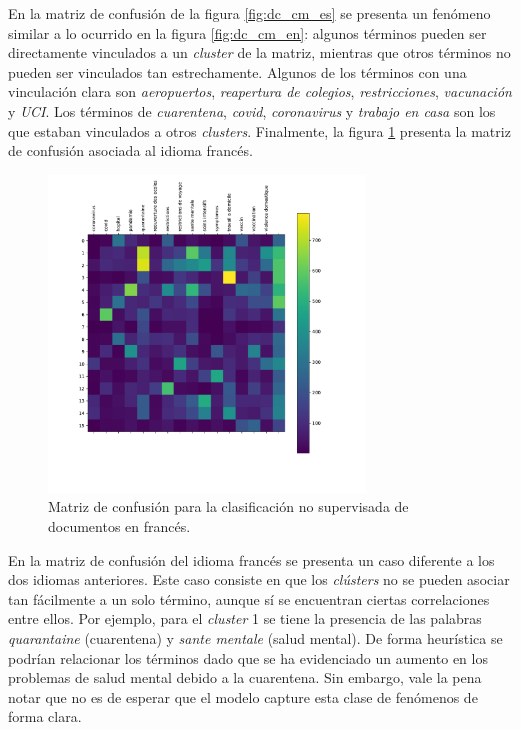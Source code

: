 En la matriz de confusión de la figura \ref{fig:dc_cm_es} se presenta un fenómeno similar a lo ocurrido en la figura \ref{fig:dc_cm_en}: algunos términos pueden ser directamente vinculados a un \textit{cluster} de la matriz, mientras que otros términos no pueden ser vinculados tan estrechamente. Algunos de los términos con una vinculación clara son \textit{aeropuertos}, \textit{reapertura de colegios}, \textit{restricciones}, \textit{vacunación} y \textit{UCI}. Los términos de \textit{cuarentena}, \textit{covid}, \textit{coronavirus} y \textit{trabajo en casa} son los que estaban vinculados a otros \textit{clusters}. Finalmente, la figura \ref{fig:dc_cm_fr} presenta la matriz de confusión asociada al idioma francés. \\

\begin{figure}[H]
    \centering
    \includegraphics[width=0.75\textwidth]{results/AutomaticIdentification/cf_fr.pdf}
    \caption{Matriz de confusión para la clasificación no supervisada de documentos en francés.}
    \label{fig:dc_cm_fr}
\end{figure}

En la matriz de confusión del idioma francés se presenta un caso diferente a los dos idiomas anteriores. Este caso consiste en que los \textit{clústers} no se pueden asociar tan fácilmente a un solo término, aunque sí se encuentran ciertas correlaciones entre ellos. Por ejemplo, para el \textit{cluster} 1 se tiene la presencia de las palabras \textit{quarantaine} (cuarentena) y \textit{sante mentale} (salud mental). De forma heurística se podrían relacionar los términos dado que se ha evidenciado un aumento en los problemas de salud mental debido a la cuarentena. Sin embargo, vale la pena notar que no es de esperar que el modelo capture esta clase de fenómenos de forma clara. 

